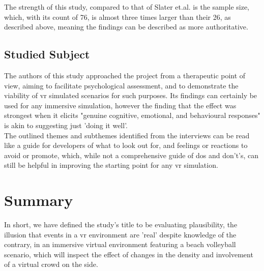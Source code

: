 The strength of this study, compared to that of Slater et.al. is the sample size, which, with its count of 76, is almost three times larger than their 26, as described above, meaning the findings can be described as more authoritative.\\

\subsection{Studied Subject}

The authors of this study approached the project from a therapeutic point of view, aiming to facilitate psychological assessment, and to demonstrate the viability of \gls{vr} simulated scenarios for such purposes. Its findings can certainly be used for any immersive simulation, however the finding that the effect was strongest when it elicits "genuine cognitive, emotional, and behavioural responses" is akin to suggesting just 'doing it well'.\\
The outlined themes and subthemes identified from the interviews can be read like a guide for developers of what to look out for, and feelings or reactions to avoid or promote, which, while not a comprehensive guide of dos and don't's, can still be helpful in improving the starting point for any \gls{vr} simulation.

\section{Summary}

In short, we have defined the study's title to be evaluating plausibility, the illusion that events in a \gls{vr} environment are 'real' despite knowledge of the contrary, in an immersive virtual environment featuring a beach volleyball scenario, which will inspect the effect of changes in the density and involvement of a virtual crowd on the side.\\

